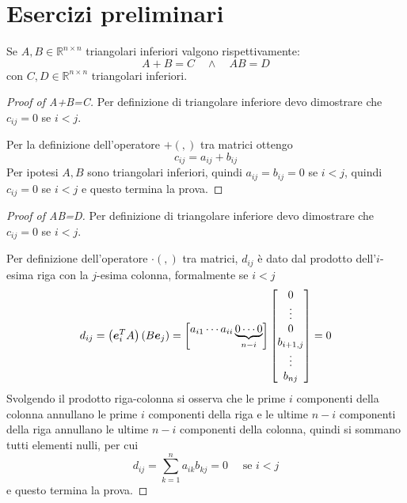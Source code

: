 \section{Esercizi preliminari}

\begin{exercise}[3.2]
\label{exercise:32}
Se $A, B \in \mathbb{R}^{n \times n}$ triangolari inferiori valgono
rispettivamente:
\begin{displaymath}
A + B = C \quad \wedge \quad AB = D
\end{displaymath}
con $C, D \in \mathbb{R}^{n \times n}$ triangolari inferiori.
\end{exercise}
\begin{proof}[Proof of A+B=C]
Per definizione di triangolare inferiore devo dimostrare che $c_{ij} = 0$ se $i
< j$.

Per la definizione dell'operatore $+(,)$ tra matrici ottengo
\begin{displaymath}
c_{ij} = a_{ij} + b_{ij} 
\end{displaymath}
Per ipotesi $A,B$ sono triangolari inferiori, quindi $a_{ij} = b_{ij} = 0$ se
$i < j$, quindi $c_{ij} = 0$ se $i < j$ e questo termina la prova.
\end{proof}

\begin{proof}[Proof of AB=D]
Per definizione di triangolare inferiore devo dimostrare che $c_{ij} = 0$ se $i
< j$.

Per definizione dell'operatore $\cdot(,)$ tra matrici, $d_{ij}$ \`e dato dal
prodotto dell'$i$-esima riga con la $j$-esima colonna, formalmente se $i < j$
\begin{displaymath}
d_{ij} = \left ( \boldsymbol{e}_{i}^{T}A \right ) \left ( B \boldsymbol{e}_{j} \right) = 
\begin{bmatrix}
a_{i1} \cdots a_{ii} \underbrace{0 \cdots 0}_{n-i}
\end{bmatrix}
\begin{bmatrix}
0 \\
\vdots \\
0 \\
b_{i+1,j}
\\
\vdots \\
b_{nj}
\end{bmatrix} = 0
\end{displaymath}
Svolgendo il prodotto riga-colonna si osserva che le prime $i$ componenti della
colonna annullano le prime $i$ componenti della riga e le ultime $n-i$
componenti della riga annullano le ultime $n-i$ componenti della colonna, quindi
si sommano tutti elementi nulli, per cui
\begin{displaymath}
d_{ij} = \sum_{k = 1}^{n}{a_{ik}b_{kj}} = 0 \quad \text{ se } i < j
\end{displaymath} e questo termina la prova.
\end{proof}


